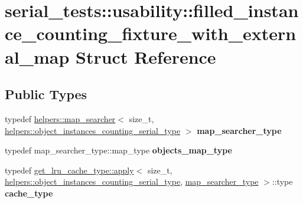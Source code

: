 \hypertarget{structserial__tests_1_1usability_1_1filled__instance__counting__fixture__with__external__map}{}\section{serial\+\_\+tests\+:\+:usability\+:\+:filled\+\_\+instance\+\_\+counting\+\_\+fixture\+\_\+with\+\_\+external\+\_\+map Struct Reference}
\label{structserial__tests_1_1usability_1_1filled__instance__counting__fixture__with__external__map}
\subsection*{Public Types}
\begin{DoxyCompactItemize}
\item 
\hypertarget{structserial__tests_1_1usability_1_1filled__instance__counting__fixture__with__external__map_a14568b7b180fb5d8a8c5bb60cb957cc6}{}typedef \hyperlink{structserial__tests_1_1usability_1_1helpers_1_1map__searcher}{helpers\+::map\+\_\+searcher}$<$ size\+\_\+t, \hyperlink{structhelpers_1_1object__instances__counting__type}{helpers\+::object\+\_\+instances\+\_\+counting\+\_\+serial\+\_\+type} $>$ {\bfseries map\+\_\+searcher\+\_\+type}\label{structserial__tests_1_1usability_1_1filled__instance__counting__fixture__with__external__map_a14568b7b180fb5d8a8c5bb60cb957cc6}

\item 
\hypertarget{structserial__tests_1_1usability_1_1filled__instance__counting__fixture__with__external__map_a2666fa0565d6eb9eccbafae150346cf9}{}typedef map\+\_\+searcher\+\_\+type\+::map\+\_\+type {\bfseries objects\+\_\+map\+\_\+type}\label{structserial__tests_1_1usability_1_1filled__instance__counting__fixture__with__external__map_a2666fa0565d6eb9eccbafae150346cf9}

\item 
\hypertarget{structserial__tests_1_1usability_1_1filled__instance__counting__fixture__with__external__map_a70c24db004c87afb6fcb844e0d889f4d}{}typedef \hyperlink{structget__lru__cache__type_1_1apply}{get\+\_\+lru\+\_\+cache\+\_\+type\+::apply}$<$ size\+\_\+t, \hyperlink{structhelpers_1_1object__instances__counting__type}{helpers\+::object\+\_\+instances\+\_\+counting\+\_\+serial\+\_\+type}, \hyperlink{structserial__tests_1_1usability_1_1helpers_1_1map__searcher}{map\+\_\+searcher\+\_\+type} $>$\+::type {\bfseries cache\+\_\+type}\label{structserial__tests_1_1usability_1_1filled__instance__counting__fixture__with__external__map_a70c24db004c87afb6fcb844e0d889f4d}

\end{DoxyCompactItemize}
